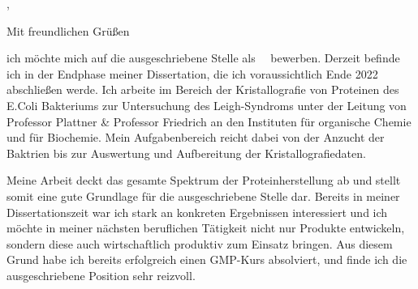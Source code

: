 



\recipient{\firma{}}{\adresse{}}
\opening{\anrede{},}
\date{\today}
\closing{Mit freundlichen Grüßen}
{}
\makelettertitle
\justifying



ich möchte mich auf die ausgeschriebene Stelle als \stelleText~\firmaText~bewerben. Derzeit befinde ich in der Endphase meiner Dissertation, die ich voraussichtlich Ende 2022 abschließen werde. Ich arbeite im Bereich der Kristallografie von Proteinen des E.Coli Bakteriums zur Untersuchung des Leigh-Syndroms unter der Leitung von Professor Plattner \& Professor Friedrich an den Instituten für organische Chemie und für Biochemie. Mein Aufgabenbereich reicht dabei von der Anzucht der Baktrien bis zur Auswertung und Aufbereitung der Kristallografiedaten.\par
Meine Arbeit deckt das gesamte Spektrum der Proteinherstellung ab und stellt somit eine gute Grundlage für die ausgeschriebene Stelle dar. Bereits in meiner Dissertationszeit war ich stark an konkreten Ergebnissen interessiert und ich möchte in meiner nächsten beruflichen Tätigkeit nicht nur Produkte entwickeln, sondern diese auch wirtschaftlich produktiv zum Einsatz bringen. Aus diesem Grund habe ich bereits erfolgreich einen GMP-Kurs absolviert, und finde ich die ausgeschriebene Position sehr reizvoll.\par 


